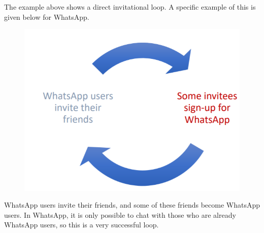 \documentclass[a4paper, openany]{memoir}
\begin{document}
The example above shows a direct invitational loop. A specific example of this is given below for WhatsApp.
\begin{figure}[H]
    \centering
    \includegraphics[scale=0.5]{src/18.2 Watsapp growth loop.PNG}
\end{figure}
\noindent WhatsApp users invite their friends, and some of these friends become WhatsApp users. In WhatsApp, it is only possible to chat with those who are already WhatsApp users, so this is a very successful loop.
\end{document}
